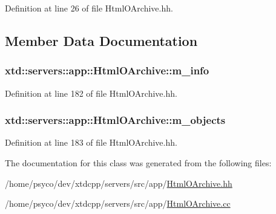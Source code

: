 Definition at line 26 of file Html\+O\+Archive.\+hh.



\subsection{Member Data Documentation}
\subsubsection[{\texorpdfstring{m\+\_\+info}{m_info}}]{ xtd\+::servers\+::app\+::\+Html\+O\+Archive\+::m\+\_\+info}\hypertarget{classxtd_1_1servers_1_1app_1_1HtmlOArchive_a03bd854507f8457a3b5b575203108ff7}{}\label{classxtd_1_1servers_1_1app_1_1HtmlOArchive_a03bd854507f8457a3b5b575203108ff7}


Definition at line 182 of file Html\+O\+Archive.\+hh.

\subsubsection[{\texorpdfstring{m\+\_\+objects}{m_objects}}]{ xtd\+::servers\+::app\+::\+Html\+O\+Archive\+::m\+\_\+objects}\hypertarget{classxtd_1_1servers_1_1app_1_1HtmlOArchive_a69e333ff9b2b0743e14976cfa4afd6d2}{}\label{classxtd_1_1servers_1_1app_1_1HtmlOArchive_a69e333ff9b2b0743e14976cfa4afd6d2}


Definition at line 183 of file Html\+O\+Archive.\+hh.



The documentation for this class was generated from the following files\+:\begin{DoxyCompactItemize}
\item 
/home/psyco/dev/xtdcpp/servers/src/app/\hyperlink{HtmlOArchive_8hh}{Html\+O\+Archive.\+hh}\item 
/home/psyco/dev/xtdcpp/servers/src/app/\hyperlink{HtmlOArchive_8cc}{Html\+O\+Archive.\+cc}\end{DoxyCompactItemize}
